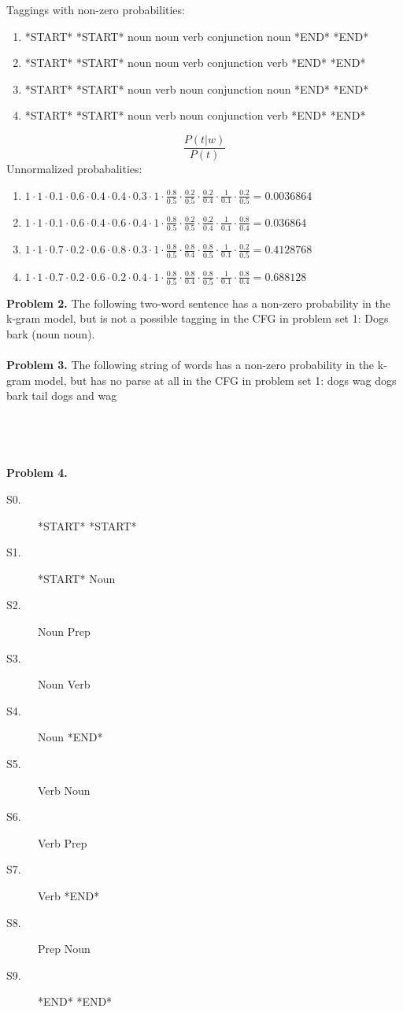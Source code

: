 \documentclass{article}
\begin{document}
Taggings with non-zero probabilities:
\begin{enumerate}
	\item *START* *START* noun noun verb conjunction noun *END* *END*
	\item *START* *START* noun noun verb conjunction verb *END* *END*
	\item *START* *START* noun verb noun conjunction noun *END* *END*
	\item *START* *START* noun verb noun conjunction verb *END* *END*
\end{enumerate}
$$\frac{P(t|w)}{P(t)}$$
Unnormalized probabalities:
\begin{enumerate}
	\item $1\cdot 1\cdot 0.1\cdot 0.6\cdot 0.4\cdot 0.4\cdot 0.3\cdot 1\cdot\frac{0.8}{0.5}\cdot\frac{0.2}{0.5}\cdot\frac{0.2}{0.4}\cdot\frac{1}{0.1}\cdot\frac{0.2}{0.5}=0.0036864$
	\item $1\cdot 1\cdot 0.1\cdot 0.6\cdot 0.4\cdot 0.6\cdot 0.4\cdot 1\cdot\frac{0.8}{0.5}\cdot\frac{0.2}{0.5}\cdot\frac{0.2}{0.4}\cdot\frac{1}{0.1}\cdot\frac{0.8}{0.4}=0.036864$
	\item $1\cdot 1\cdot 0.7\cdot 0.2\cdot 0.6\cdot 0.8\cdot 0.3\cdot 1\cdot\frac{0.8}{0.5}\cdot\frac{0.8}{0.4}\cdot\frac{0.8}{0.5}\cdot\frac{1}{0.1}\cdot\frac{0.2}{0.5}=0.4128768$
	\item $1\cdot 1\cdot 0.7\cdot 0.2\cdot 0.6\cdot 0.2\cdot 0.4\cdot 1\cdot\frac{0.8}{0.5}\cdot\frac{0.8}{0.4}\cdot\frac{0.8}{0.5}\cdot\frac{1}{0.1}\cdot\frac{0.8}{0.4}=0.688128$
\end{enumerate}
\textbf{Problem 2.} The following two-word sentence has a non-zero probability in the k-gram model, but is not a possible tagging in the CFG in problem set 1: Dogs bark (noun noun).\\
\\
\textbf{Problem 3.} The following string of words has a non-zero probability in the k-gram model, but has no parse at all in the CFG in problem set 1: dogs wag dogs bark tail dogs and wag\\
\\
\\
\\
\\
\textbf{Problem 4.}
\begin{description}
	\item [S0.] *START* *START*
	\item [S1.] *START* Noun
	\item [S2.] Noun Prep
	\item [S3.] Noun Verb
	\item [S4.] Noun *END*
	\item [S5.] Verb Noun
	\item [S6.] Verb Prep
	\item [S7.] Verb *END*
	\item [S8.] Prep Noun
	\item [S9.] *END* *END*
\end{description}
\end{document}

